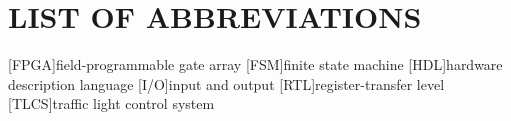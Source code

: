 \documentclass[12pt,a4paper]{article}
\begin{document}
\section*{LIST OF ABBREVIATIONS}
\begin{acronym}[TLCS]\itemsep0pt
	[FPGA]{field-programmable gate array}
	[FSM]{finite state machine}
	[HDL]{hardware description language}
	[I/O]{input and output}
	[RTL]{register-transfer level}
	[TLCS]{traffic light control system}
\end{acronym}

\clearpage
\fancyhead[L]{\footnotesize\textsl{\nouppercase\leftmark}}
\titleformat{\section}{\normalfont\Large\bfseries}{\thesection}{1em}{}
\onehalfspacing{}
\clearpage


\clearpage

\clearpage

\clearpage

\clearpage

\clearpage


\clearpage
{}
\fancyhead{}
\fancyhead[L]{\footnotesize\textsl{\nouppercase\rightmark}}

\clearpage
\fancyhead{}
\fancyhead[L]{\footnotesize\textsl{\nouppercase\leftmark}}
\begin{flushleft}
	\singlespacing{}
	\setlength{\bibitemsep}{\baselineskip}
	\titleformat{\section}{\normalfont\Large\bfseries\centering}{\thesection}{1em}{}
	\renewcommand{\refname}{REFERENCES}
	\printbibliography{}
\end{flushleft}
\end{document}
